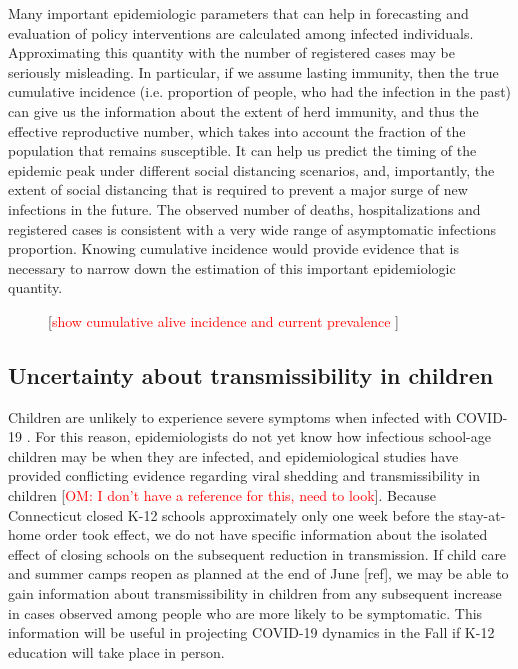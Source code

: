 \documentclass[11pt]{article}
\newcommand{\comment}[1]{[\textcolor{red}{#1}]}
\begin{document}
Many important epidemiologic parameters that can help in forecasting and evaluation of policy interventions are calculated among infected individuals. Approximating this quantity with the number of registered cases may be seriously misleading. In particular, if we assume lasting immunity, then the true cumulative incidence (i.e. proportion of people, who had the infection in the past) can give us the information about the extent of herd immunity, and thus the effective reproductive number, which takes into account the fraction of the population that remains susceptible. It can help us predict the timing of the epidemic peak under different social distancing scenarios, and, importantly, the extent of social distancing that is required to prevent a major surge of new infections in the future. The observed number of deaths, hospitalizations and registered cases is consistent with a very wide range of asymptomatic infections proportion. Knowing cumulative incidence would provide evidence that is necessary to narrow down the estimation of this important epidemiologic quantity. 



\begin{figure}
\centering
\caption{\comment{show cumulative alive incidence and current prevalence }}
\label{fig:cumincidence}
\end{figure}





\subsection*{Uncertainty about transmissibility in children}

Children are unlikely to experience severe symptoms when infected with COVID-19 \citep{verity2020estimates}. For this reason, epidemiologists do not yet know how infectious school-age children may be when they are infected, and epidemiological studies have provided conflicting evidence regarding viral shedding and transmissibility in children \comment{OM: I don't have a reference for this, need to look}. Because Connecticut closed K-12 schools approximately only one week before the stay-at-home order took effect, we do not have specific information about the isolated effect of closing schools on the subsequent reduction in transmission.  If child care and summer camps reopen as planned at the end of June [ref], we may be able to gain information about transmissibility in children from any subsequent increase in cases observed among people who are more likely to be symptomatic.  This information will be useful in projecting COVID-19 dynamics in the Fall if K-12 education will take place in person. 
\end{document}
